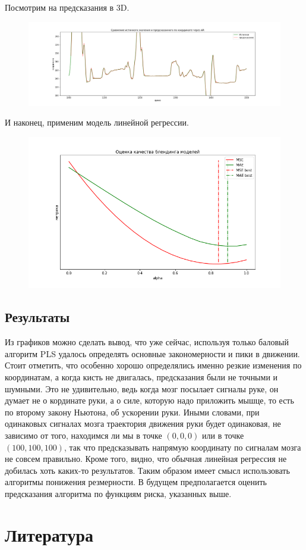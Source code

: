 \documentclass{article}
\begin{document}
Посмотрим на предсказания в 3D.
\begin{figure}[H]
\includegraphics[scale=0.5]{images/4.png}
\end{figure}
И наконец, применим модель линейной регрессии.
\begin{figure}[H]
\includegraphics[scale=0.5]{images/5.png}
\end{figure}

\subsection{Результаты}
Из графиков можно сделать вывод, что уже сейчас, используя только баловый алгоритм PLS удалось определять основные закономерности и пики в движении. Стоит отметить, что особенно хорошо определялись именно резкие изменения по координатам, а когда кисть не двигалась, предсказания были не точными и шумными. Это не удивительно, ведь когда мозг посылает сигналы руке, он думает не о кординате руки, а о силе, которую надо приложить мышце, то есть по второму закону Ньютона, об ускорении руки. Иными словами, при одинаковых сигналах мозга траектория движения руки будет одинаковая, не зависимо от того, находимся ли мы в точке $(0,0,0)$ или в точке $(100,100,100)$, так что предсказывать напрямую координату по сигналам мозга не совсем правильно. Кроме того, видно, что обычная линейная регрессия не добилась хоть каких-то результатов. Таким образом имеет смысл использовать алгоритмы понижения резмерности. В будущем предполагается оценить предсказания алгоритма по функциям риска, указанных выше.

\section{Литература}



\nocite{*}


\end{document}
